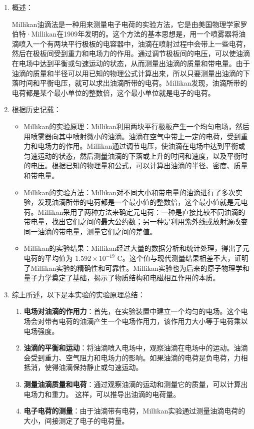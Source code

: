 \documentclass[dvipsnames, svgnames,a4paper,11pt]{article}
\begin{document}
	\begin{enumerate}
		\item 概述：
		
		Millikan油滴法是一种用来测量电子电荷的实验方法，它是由美国物理学家罗伯特·Millikan在1909年发明的。这个方法的基本思想是，用一个喷雾器将油滴喷入一个有两块平行极板的电容器中，油滴在喷射过程中会带上一些电荷，然后在极板间受到重力和电场力的作用。通过调节极板间的电压，可以使油滴在电场中达到平衡或匀速运动的状态，从而测量出油滴的质量和带电量。由于油滴的质量和半径可以用已知的物理公式计算出来，所以只要测量出油滴的下落时间和平衡电压，就可以求出油滴所带的电荷。Millikan发现，油滴所带的电荷都是某个最小单位的整数倍，这个最小单位就是电子的电荷。
		
		\item 根据历史记载：
		\begin{itemize}
			\item Millikan的实验原理：Millikan利用两块平行极板产生一个均匀电场，然后用喷雾器向其中喷射微小的油滴。油滴在空气中带上一定的电荷，受到重力和电场力的作用。Millikan通过调节电压，使油滴在电场中达到平衡或匀速运动的状态，然后测量油滴的下落或上升的时间和速度，以及平衡时的电压。根据已知的物理量和公式，可以计算出油滴的半径、密度、质量和带电量。
			\item Millikan的实验方法：Millikan对不同大小和带电量的油滴进行了多次实验，发现油滴所带的电荷都是一个最小值的整数倍，这个最小值就是元电荷。Millikan采用了两种方法来确定元电荷：一种是直接比较不同油滴的带电量，找出它们之间的最大公约数；另一种是利用紫外线或放射源改变同一油滴的带电量，测量它们之间的差值。
			\item Millikan的实验结果：Millikan经过大量的数据分析和统计处理，得出了元电荷的平均值为 $1.592 \times 10^{-19}$ C。这个值与现代测量结果相差不大，证明了Millikan实验的精确性和可靠性。Millikan实验也为后来的原子物理学和量子力学奠定了基础，揭示了物质结构和电磁相互作用的本质。
		\end{itemize}
		
		\item 综上所述，以下是本实验的实验原理总结：
		\begin{enumerate}
			\item \textbf{电场对油滴的作用力}：首先，在实验装置中建立一个均匀的电场。这个电场会对带有电荷的油滴产生一个电场作用力，该作用力大小等于电荷乘以电场强度。
			\item \textbf{油滴的平衡和运动}：将油滴喷入电场中，观察油滴在电场中的运动。油滴会受到重力、空气阻力和电场力的影响。如果油滴的电荷是负电荷，力相抵消，使得油滴保持静止或匀速运动。
			\item \textbf{测量油滴质量和电荷}：通过观察油滴的运动和测量它的质量，可以计算出电场力和重力。
			这样，可以推导出油滴的电荷量。
			\item \textbf{电子电荷的测量}：由于油滴带有电荷，Millikan实验通过测量油滴电荷的大小，间接测定了电子的电荷量。
		\end{enumerate}		
	\end{enumerate}
	
\end{document}
